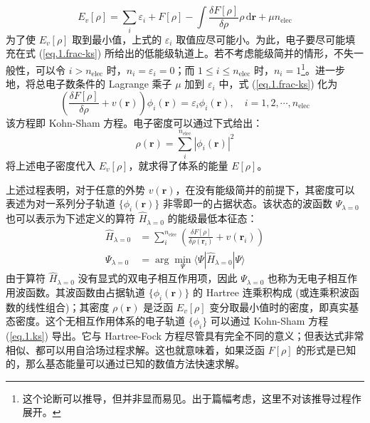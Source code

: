 \begin{equation}
  \label{eq.1.frac-ks-eng}
  E_v[\rho] = \sum_i \varepsilon_i + F[\rho] - \int \frac{\delta F[\rho]}{\delta \rho} \rho \, \mathrm{d} \bm{r} + \mu n_\mathrm{elec}
\end{equation}
为了使 $E_v[\rho]$ 取到最小值，上式的 $\varepsilon_i$ 取值应尽可能小。为此，电子要尽可能填充在式 (\ref{eq.1.frac-ks}) 所给出的低能级轨道上。若不考虑能级简并的情形，不失一般性，可以令 $i > n_\mathrm{elec}$ 时，$n_i = \varepsilon_i = 0$；而 $1 \leqslant i \leqslant n_\mathrm{elec}$ 时，$n_i = 1$\footnote{这个论断可以推导，但并非显而易见。出于篇幅考虑，这里不对该推导过程作展开。}。进一步地，将总电子数条件的 Lagrange 乘子 $\mu$ 加到 $\varepsilon_i$ 中，式 (\ref{eq.1.frac-ks}) 化为
\begin{equation}
  \label{eq.1.ks}
  \left( \frac{\delta F[\rho]}{\delta \rho} + v(\bm{r}) \right) \phi_i (\bm{r}) = \varepsilon_i \phi_i (\bm{r}), \quad i = 1, 2, \cdots, n_\mathrm{elec}
\end{equation}
该方程即 Kohn-Sham 方程。电子密度可以通过下式给出：
\begin{equation}
  \rho(\bm{r}) = \sum_i^{n_\mathrm{elec}} |\phi_i(\bm{r})|^2
\end{equation}
将上述电子密度代入 $E_v[\rho]$，就求得了体系的能量 $E[\rho]$。

上述过程表明，对于任意的外势 $v(\bm{r})$，在没有能级简并的前提下，其密度可以表述为对一系列分子轨道 $\{ \phi_i ({\bm{r}}) \}$ 非零即一的占据状态。该状态的波函数 $\Psi_{\lambda = 0}$ 也可以表示为下述定义的算符 $\hat H_{\lambda=0}$ 的能级最低本征态：
\begin{align}
  \hat H_{\lambda = 0} &= \sum_{i}^{n_\mathrm{elec}} \left( \frac{\delta F[\rho]}{\delta \rho(\bm{r}_i)} + v(\bm{r}_i) \right) \\
  \label{eq.1.psi-lambda-0}
  \Psi_{\lambda = 0} &= \arg \min_{\Psi} \langle \Psi | \hat H_{\lambda = 0} | \Psi \rangle
\end{align}
由于算符 $\hat H_{\lambda = 0}$ 没有显式的双电子相互作用项，因此 $\Psi_{\lambda = 0}$ 也称为无电子相互作用波函数。其波函数由占据轨道 $\{ \phi_i ({\bm{r}}) \}$ 的 Hartree 连乘积构成 (或连乘积波函数的线性组合)；其密度 $\rho(\bm{r})$ 是泛函 $E_v[\rho]$ 变分取最小值时的密度，即真实基态密度。这个无相互作用体系的电子轨道 $\{\phi_i\}$ 可以通过 Kohn-Sham 方程 (\ref{eq.1.ks}) 导出。它与 Hartree-Fock 方程尽管具有完全不同的意义；但表达式非常相似、都可以用自洽场过程求解。这也就意味着，如果泛函 $F[\rho]$ 的形式是已知的，那么基态能量可以通过已知的数值方法快速求解。

